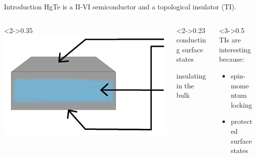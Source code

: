 \begin{frame}{Introduction}
		HgTe is a II-VI semiconductor and a topological insulator (TI).
		\vspace{10px}
	\begin{columns} 
		\begin{column}<2->{0.35\linewidth} \centering
			\includegraphics[width=\linewidth]{extrabilder_fuer_vortrag/Introduction1.jpg}
		\end{column}
		\begin{column}<2->{0.23\linewidth} 
			conducting surface states
			
			\vspace{5px}
			insulating in the bulk
			
			\vspace{15pt}
		\end{column}\hfill
		\begin{column}<3->{0.5\linewidth} 
			TIs are interesting because:
			\begin{itemize}
				\item<4-> spin-momentum locking
				\item<5-> protected surface states
			\end{itemize}
		\end{column}\hfill
	\end{columns}
	

\end{frame}
